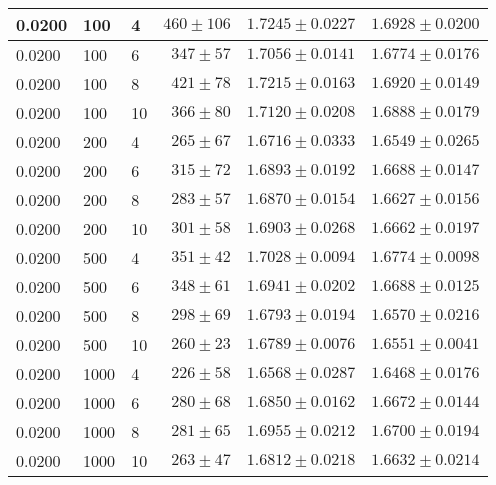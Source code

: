 \begin{table}
\begin{center}
{\begin{tabular}{|l|l|l|r|r|r|}
0.0200 & 100 & 4 & $460\pm106$ & $1.7245\pm0.0227$ & $1.6928\pm0.0200$ \\ \hline
0.0200 & 100 & 6 & $347\pm57$ & $1.7056\pm0.0141$ & $1.6774\pm0.0176$ \\ \hline
0.0200 & 100 & 8 & $421\pm78$ & $1.7215\pm0.0163$ & $1.6920\pm0.0149$ \\ \hline
0.0200 & 100 & 10 & $366\pm80$ & $1.7120\pm0.0208$ & $1.6888\pm0.0179$ \\ \hline
0.0200 & 200 & 4 & $265\pm67$ & $1.6716\pm0.0333$ & $1.6549\pm0.0265$ \\ \hline
0.0200 & 200 & 6 & $315\pm72$ & $1.6893\pm0.0192$ & $1.6688\pm0.0147$ \\ \hline
0.0200 & 200 & 8 & $283\pm57$ & $1.6870\pm0.0154$ & $1.6627\pm0.0156$ \\ \hline
0.0200 & 200 & 10 & $301\pm58$ & $1.6903\pm0.0268$ & $1.6662\pm0.0197$ \\ \hline
0.0200 & 500 & 4 & $351\pm42$ & $1.7028\pm0.0094$ & $1.6774\pm0.0098$ \\ \hline
0.0200 & 500 & 6 & $348\pm61$ & $1.6941\pm0.0202$ & $1.6688\pm0.0125$ \\ \hline
0.0200 & 500 & 8 & $298\pm69$ & $1.6793\pm0.0194$ & $1.6570\pm0.0216$ \\ \hline
0.0200 & 500 & 10 & $260\pm23$ & $1.6789\pm0.0076$ & $1.6551\pm0.0041$ \\ \hline
0.0200 & 1000 & 4 & $226\pm58$ & $1.6568\pm0.0287$ & $1.6468\pm0.0176$ \\ \hline
0.0200 & 1000 & 6 & $280\pm68$ & $1.6850\pm0.0162$ & $1.6672\pm0.0144$ \\ \hline
0.0200 & 1000 & 8 & $281\pm65$ & $1.6955\pm0.0212$ & $1.6700\pm0.0194$ \\ \hline
0.0200 & 1000 & 10 & $263\pm47$ & $1.6812\pm0.0218$ & $1.6632\pm0.0214$ \\ \hline


\end{tabular}}
\end{center}
\end{table}
